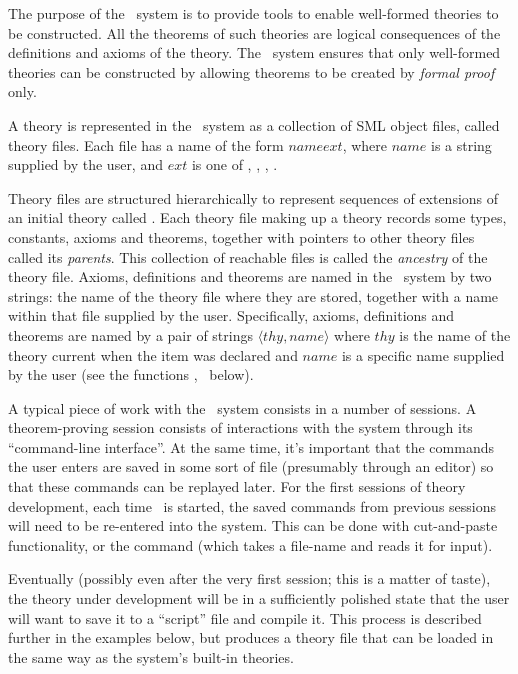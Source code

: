The purpose of the \HOL\ system is to provide tools to enable
well-formed theories to be constructed.  All the theorems of such
theories are logical consequences of the definitions and axioms of the
theory.  The \HOL\ system ensures that only well-formed theories can
be constructed by allowing theorems to be created by {\it formal
  proof\/} only.

A theory is represented in the \HOL\ system as a collection of SML
object files, called theory files.  Each file has a name of the form
$name$$ext$, where $name$ is a string supplied by the
user, and $ext$ is one of , , , .

Theory files are structured hierarchically to represent sequences of
extensions of an initial theory called .  Each theory file
making up a theory records some types, constants, axioms and theorems,
together with pointers to other theory files called its {\it
  parents\/}.  This collection of reachable files is called the {\it
  ancestry\/} of the theory file. Axioms, definitions and theorems are
named in the \HOL\ system by two strings: the name of the theory file
where they are stored, together with a name within that file supplied
by the user.  Specifically, axioms, definitions and theorems are named
by a pair of strings $\langle thy,name\rangle$ where $thy$ is the name
of the theory current when the item was declared and $name$ is a
specific name supplied by the user (see the functions ,
 \etc\ below).

A typical piece of work with the \HOL\ system consists in a number of
sessions.  A theorem-proving session consists of interactions with the
system through its ``command-line interface''.  At the same time, it's
important that the commands the user enters are saved in some sort of
file (presumably through an editor) so that these commands can be
replayed later.  For the first sessions of theory development, each
time \HOL\ is started, the saved commands from previous sessions will
need to be re-entered into the system.  This can be done with
cut-and-paste functionality, or the  command (which takes a
file-name and reads it for input).

Eventually (possibly even after the very first session; this is a
matter of taste), the theory under development will be in a
sufficiently polished state that the user will want to save it to a
``script'' file and compile it.  This process is described further in
the examples below, but produces a theory file that can be loaded in
the same way as the system's built-in theories.


